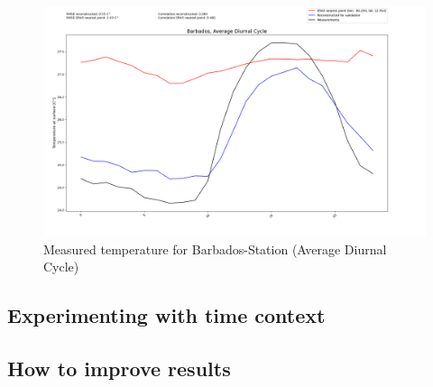\begin{figure}
    \centering
    \includegraphics[width=\textwidth]{resources/images/charts/barbados_eval_grib_final/Barbados, Average Diurnal Cycle.png}
    \caption{Measured temperature for Barbados-Station (Average Diurnal Cycle)}
\end{figure}

\newpage

\subsection{Experimenting with time context}

\subsection{How to improve results}